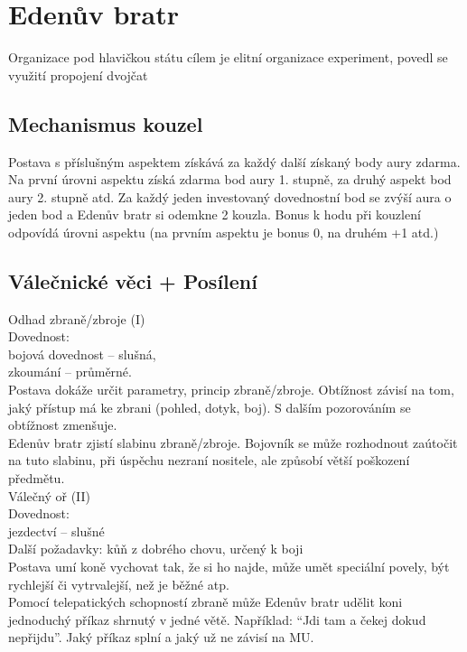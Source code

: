 \documentclass[../main.tex]{subfiles}
\begin{document}
\section{Edenův bratr}
\label{sec:edenuvbratr}

Organizace
pod hlavičkou státu
cílem je elitní organizace
experiment, povedl se
využití propojení dvojčat

\subsection{Mechanismus kouzel}
\label{sec:eden-mech-kouzla}

Postava s příslušným aspektem získává za každý další získaný body aury zdarma. Na první úrovni aspektu získá zdarma bod aury 1. stupně, za druhý aspekt bod aury 2. stupně atd. Za každý jeden investovaný dovednostní bod se zvýší aura o jeden bod a Edenův bratr si odemkne 2 kouzla. Bonus k hodu při kouzlení odpovídá úrovni aspektu (na prvním aspektu je bonus 0, na druhém +1 atd.)\\

\subsection{Válečnické věci + Posílení}
\label{sec:eden-valecnici-posileni}

Odhad zbraně/zbroje (I)\\
Dovednost:\\
bojová dovednost – slušná,\\
zkoumání – průměrné.\\
Postava dokáže určit parametry, princip zbraně/zbroje. Obtížnost závisí na tom, jaký přístup má ke zbrani (pohled, dotyk, boj). S dalším pozorováním se obtížnost zmenšuje.\\
Edenův bratr zjistí slabinu zbraně/zbroje. Bojovník se může rozhodnout zaútočit na tuto slabinu, při úspěchu nezraní nositele, ale způsobí větší poškození předmětu.\\


Válečný oř (II)\\
Dovednost:\\
 jezdectví – slušné\\
Další požadavky: kůň z dobrého chovu, určený k boji\\
Postava umí koně vychovat tak, že si ho najde, může umět speciální povely, být rychlejší či vytrvalejší, než je běžné atp.\\
Pomocí telepatických schopností zbraně může Edenův bratr udělit koni jednoduchý příkaz shrnutý v jedné větě. Například: “Jdi tam a čekej dokud nepřijdu”. Jaký příkaz splní a jaký už ne závisí na MU.\\
\end{document}
